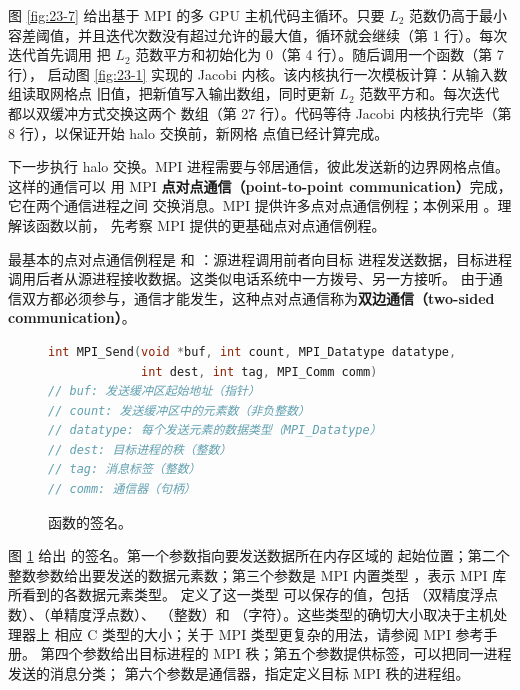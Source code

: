 图 \ref{fig:23-7} 给出基于 MPI 的多 GPU 主机代码主循环。只要 $L_2$ 范数仍高于最小
容差阈值，并且迭代次数没有超过允许的最大值，循环就会继续（第 1 行）。每次迭代首先调用
 把 $L_2$ 范数平方和初始化为 0（第 4 行）。随后调用一个函数（第 7 行），
启动图 \ref{fig:23-1} 实现的 Jacobi 内核。该内核执行一次模板计算：从输入数组读取网格点
旧值，把新值写入输出数组，同时更新 $L_2$ 范数平方和。每次迭代都以双缓冲方式交换这两个
数组（第 27 行）。代码等待 Jacobi 内核执行完毕（第 8 行），以保证开始 halo 交换前，新网格
点值已经计算完成。

下一步执行 halo 交换。MPI 进程需要与邻居通信，彼此发送新的边界网格点值。这样的通信可以
用 MPI \textbf{点对点通信（point-to-point communication）}完成，它在两个通信进程之间
交换消息。MPI 提供许多点对点通信例程；本例采用 。理解该函数以前，
先考察 MPI 提供的更基础点对点通信例程。

最基本的点对点通信例程是  和 ：源进程调用前者向目标
进程发送数据，目标进程调用后者从源进程接收数据。这类似电话系统中一方拨号、另一方接听。
由于通信双方都必须参与，通信才能发生，这种点对点通信称为\textbf{双边通信（two-sided
communication）}。

\begin{figure}[htbp]
  \centering
  \begin{lstlisting}[language=C,numbers=none,basicstyle=\ttfamily\scriptsize]
int MPI_Send(void *buf, int count, MPI_Datatype datatype,
             int dest, int tag, MPI_Comm comm)
// buf: 发送缓冲区起始地址（指针）
// count: 发送缓冲区中的元素数（非负整数）
// datatype: 每个发送元素的数据类型（MPI_Datatype）
// dest: 目标进程的秩（整数）
// tag: 消息标签（整数）
// comm: 通信器（句柄）
  \end{lstlisting}
  \caption{ 函数的签名。}
  \label{fig:23-8}
\end{figure}

图 \ref{fig:23-8} 给出  的签名。第一个参数指向要发送数据所在内存区域的
起始位置；第二个整数参数给出要发送的数据元素数；第三个参数是 MPI 内置类型
，表示 MPI 库所看到的各数据元素类型。 定义了这一类型
可以保存的值，包括 （双精度浮点数）、（单精度浮点数）、
（整数）和 （字符）。这些类型的确切大小取决于主机处理器上
相应 C 类型的大小；关于 MPI 类型更复杂的用法，请参阅 MPI 参考手册\cite{ch23-mpi}。
第四个参数给出目标进程的 MPI 秩；第五个参数提供标签，可以把同一进程发送的消息分类；
第六个参数是通信器，指定定义目标 MPI 秩的进程组。

